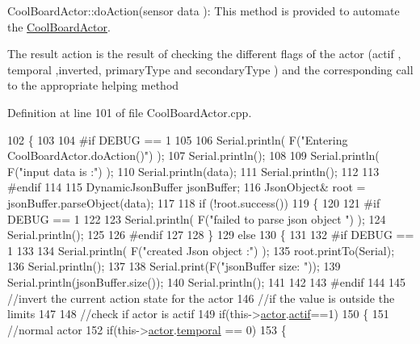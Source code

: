 Cool\+Board\+Actor\+::do\+Action(sensor data )\+: This method is provided to automate the \hyperlink{class_cool_board_actor}{Cool\+Board\+Actor}.

The result action is the result of checking the different flags of the actor (actif , temporal ,inverted, primary\+Type and secondary\+Type ) and the corresponding call to the appropriate helping method 

Definition at line 101 of file Cool\+Board\+Actor.\+cpp.


\begin{DoxyCode}
102 \{
103 
104 \textcolor{preprocessor}{#if DEBUG == 1 }
105 
106     Serial.println( F(\textcolor{stringliteral}{"Entering CoolBoardActor.doAction()"}) );
107     Serial.println();
108 
109     Serial.println( F(\textcolor{stringliteral}{"input data is :"}) );
110     Serial.println(data);
111     Serial.println();
112 
113 \textcolor{preprocessor}{#endif }
114 
115     DynamicJsonBuffer jsonBuffer;
116     JsonObject& root = jsonBuffer.parseObject(data);
117     
118     \textcolor{keywordflow}{if} (!root.success()) 
119     \{
120     
121 \textcolor{preprocessor}{    #if DEBUG == 1 }
122 
123         Serial.println( F(\textcolor{stringliteral}{"failed to parse json object "}) );
124         Serial.println();
125     
126 \textcolor{preprocessor}{    #endif }
127 
128     \}
129     \textcolor{keywordflow}{else}
130     \{
131     
132 \textcolor{preprocessor}{    #if DEBUG == 1 }
133 
134         Serial.println( F(\textcolor{stringliteral}{"created Json object :"}) );
135         root.printTo(Serial);
136         Serial.println();
137 
138         Serial.print(F(\textcolor{stringliteral}{"jsonBuffer size: "}));
139         Serial.println(jsonBuffer.size());
140         Serial.println();
141 
142     
143 \textcolor{preprocessor}{    #endif }
144 
145         \textcolor{comment}{//invert the current action state for the actor}
146         \textcolor{comment}{//if the value is outside the limits}
147         
148         \textcolor{comment}{//check if actor is actif}
149         \textcolor{keywordflow}{if}(this->\hyperlink{class_cool_board_actor_a8f190db9f7a39fddbcef7f152da970e9}{actor}.\hyperlink{struct_cool_board_actor_1_1state_a7963178c2de01ef0d2861f9f59ad6f3c}{actif}==1)
150         \{
151             \textcolor{comment}{//normal actor}
152             \textcolor{keywordflow}{if}(this->\hyperlink{class_cool_board_actor_a8f190db9f7a39fddbcef7f152da970e9}{actor}.\hyperlink{struct_cool_board_actor_1_1state_a6442a8c3a30abc48472f3e5284b786ea}{temporal} == 0)
153             \{

\end{DoxyCode}
